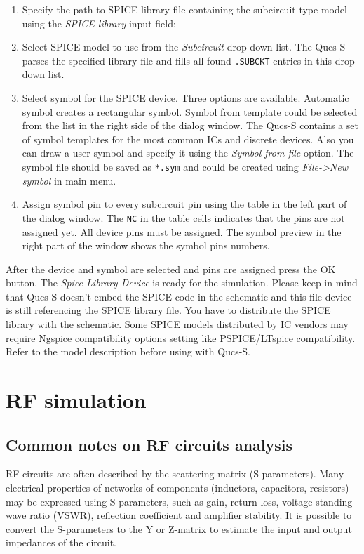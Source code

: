 \begin{enumerate}
 \item Specify the path to SPICE library file containing the subcircuit type model using the \emph{SPICE library} input field;
 \item Select SPICE model to use from the \emph{Subcircuit} drop-down list. The Qucs-S parses the specified library file and fills all found \verb|.SUBCKT| entries in this drop-down list.
 \item Select symbol for the SPICE device. Three options are available. Automatic symbol creates a rectangular symbol. Symbol from template could be selected from the list in the right side of the dialog window. The Qucs-S contains a set of symbol templates for the most common ICs and discrete devices. Also you can draw a user symbol and specify it using the \emph{Symbol from file} option. The symbol file should be saved as \verb|*.sym| and could be created using \emph{File->New symbol} in main menu.
 \item Assign symbol pin to every subcircuit pin using the table in the left part of the dialog window. The \verb|NC| in the table cells indicates that the pins are not assigned yet. All device pins must be assigned. The symbol preview in the right part of the window shows the symbol pins numbers.
\end{enumerate}

After the device and symbol are selected and pins are assigned press the OK button. The \emph{Spice Library Device} is ready for the simulation. Please keep in mind that Qucs-S doesn't embed the SPICE code in the schematic and this file device is still referencing the SPICE library file. You have to distribute the SPICE library with the schematic. Some SPICE models distributed by IC vendors may require Ngspice compatibility options setting like PSPICE/LTspice compatibility. Refer to the model description before using with Qucs-S.

\section{RF simulation}

\subsection{Common notes on RF circuits analysis}

RF circuits are often described by the scattering matrix (S-parameters). Many electrical properties of networks of components (inductors, capacitors, resistors) may be expressed using S-parameters, such as gain, return loss, voltage standing wave ratio (VSWR), reflection coefficient and amplifier stability. It is possible to convert the S-parameters to the Y or Z-matrix to estimate the input and output impedances of the circuit.

